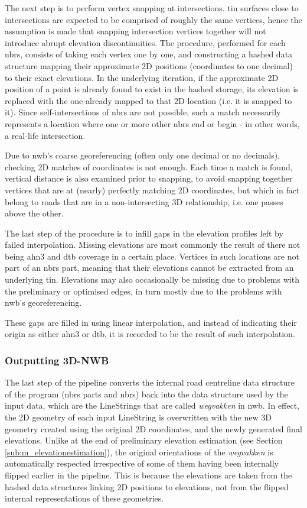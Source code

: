 The next step is to perform vertex snapping at intersections. \ac{tin} surfaces close to intersections are expected to be comprised of roughly the same vertices, hence the assumption is made that snapping intersection vertices together will not introduce abrupt elevation discontinuities. The procedure, performed for each \ac{nbrs}, consists of taking each vertex one by one, and constructing a hashed data structure mapping their approximate 2D positions (coordinates to one decimal) to their exact elevations. In the underlying iteration, if the approximate 2D position of a point is already found to exist in the hashed storage, its elevation is replaced with the one already mapped to that 2D location (i.e. it is snapped to it). Since self-intersections of \ac{nbrs} are not possible, such a match necessarily represents a location where one or more other \ac{nbrs} end or begin - in other words, a real-life intersection.

Due to \ac{nwb}'s coarse georeferencing (often only one decimal or no decimals), checking 2D matches of coordinates is not enough. Each time a match is found, vertical distance is also examined prior to snapping, to avoid snapping together vertices that are at (nearly) perfectly matching 2D coordinates, but which in fact belong to roads that are in a non-intersecting 3D relationship, i.e. one passes above the other.

The last step of the procedure is to infill gaps in the elevation profiles left by failed interpolation. Missing elevations are most commonly the result of there not being \ac{ahn3} and \ac{dtb} coverage in a certain place. Vertices in such locations are not part of an \ac{nbrs} part, meaning that their elevations cannot be extracted from an underlying \ac{tin}. Elevations may also occasionally be missing due to problems with the preliminary or optimised edges, in turn mostly due to the problems with \ac{nwb}'s georeferencing.

These gaps are filled in using linear interpolation, and instead of indicating their origin as either \ac{ahn3} or \ac{dtb}, it is recorded to be the result of such interpolation.

\subsubsection{Outputting 3D-NWB}

The last step of the pipeline converts the internal road centreline data structure of the program (\ac{nbrs} parts and \ac{nbrs}) back into the data structure used by the input data, which are the LineStrings that are called \textit{wegvakken} in \ac{nwb}. In effect, the 2D geometry of each input LineString is overwritten with the new 3D geometry created using the original 2D coordinates, and the newly generated final elevations. Unlike at the end of preliminary elevation estimation (see Section \ref{sub:m_elevationestimation}), the original orientations of the \textit{wegvakken} is automatically respected irrespective of some of them having been internally flipped earlier in the pipeline. This is because the elevations are taken from the hashed data structures linking 2D positions to elevations, not from the flipped internal representations of these geometries.

